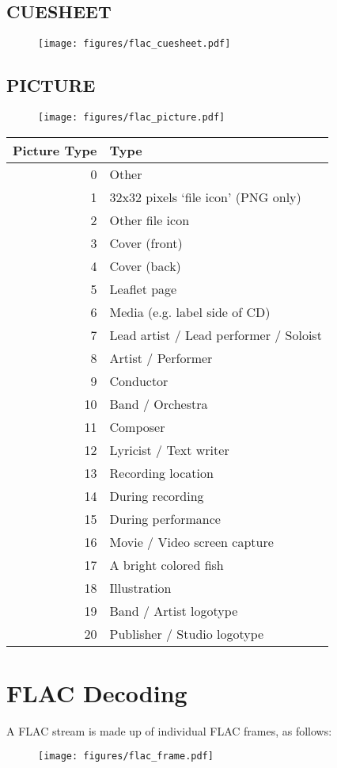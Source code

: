 \pagebreak

\subsection{CUESHEET}
\begin{figure}[h]
\texttt{[image: figures/flac\_cuesheet.pdf]}
\end{figure}

\subsection{PICTURE}
\begin{figure}[h]
\texttt{[image: figures/flac\_picture.pdf]}
\end{figure}
\begin{tabular}{|r|l|}
\hline
Picture Type & Type \\
\hline
0 & Other \\
1 & 32x32 pixels `file icon' (PNG only) \\
2 & Other file icon \\
3 & Cover (front) \\
4 & Cover (back) \\
5 & Leaflet page \\
6 & Media (e.g. label side of CD) \\
7 & Lead artist / Lead performer / Soloist \\
8 & Artist / Performer \\
9 & Conductor \\
10 & Band / Orchestra \\
11 & Composer \\
12 & Lyricist / Text writer \\
13 & Recording location \\
14 & During recording \\
15 & During performance \\
16 & Movie / Video screen capture \\
17 & A bright colored fish \\
18 & Illustration \\
19 & Band / Artist logotype \\
20 & Publisher / Studio logotype \\
\hline
\end{tabular}

\section{FLAC Decoding}
A FLAC stream is made up of individual FLAC frames, as follows:
\begin{figure}[h]
\texttt{[image: figures/flac\_frame.pdf]}
\end{figure}

